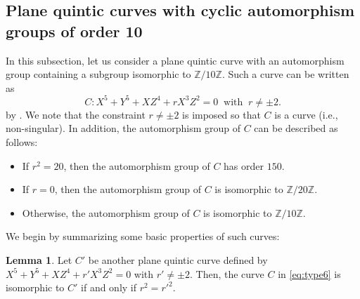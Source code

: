 \documentclass{article}
\theoremstyle{definition}
\newtheorem{Lem}[Def]{Lemma}
\begin{document}
\subsection{Plane quintic curves with cyclic automorphism groups of order 10}\label{subsec:type6}\vspace{0.5mm}
In this subsection, let us consider a plane quintic curve with an automorphism group containing a subgroup isomorphic to $\mathbb{Z}/10\mathbb{Z}$.
Such a curve can be written as\vspace{-1mm}
\begin{equation}\label{eq:type6}
    C: X^5+Y^5+XZ^4+rX^3Z^2 = 0 \ \text{ with }\ r \neq \pm 2.
\end{equation}
by \cite[Proposition 8]{BB}.
We note that the constraint $r \neq \pm 2$ is imposed so that $C$ is a curve (i.e., non-singular).
In addition, the automorphism group of $C$ can be described as follows:\vspace{-0.8mm}
\begin{itemize}
    \item If $r^2 = 20$, then the automorphism group of $C$ has order $150$.\vspace{-2.6mm}
    \item If $r = 0$, then the automorphism group of $C$ is isomorphic to $\mathbb{Z}/20\mathbb{Z}$.\vspace{-2.6mm}
    \item Otherwise, the automorphism group of $C$ is isomorphic to $\mathbb{Z}/10\mathbb{Z}$.
\end{itemize}
We begin by summarizing some basic properties of such curves:\vspace{-0.9mm}
\begin{Lem}\label{lem:isom_for_type6}
Let $C'$ be another plane quintic curve defined by $X^5+Y^5+XZ^4+r'X^3Z^2 = 0$ with $r' \neq \pm 2$.
Then, the curve $C$ in \eqref{eq:type6} is isomorphic to $C'$ if and only if $r^2 = r'^2$.\vspace{-0.5mm}
\end{Lem}
\end{document}
